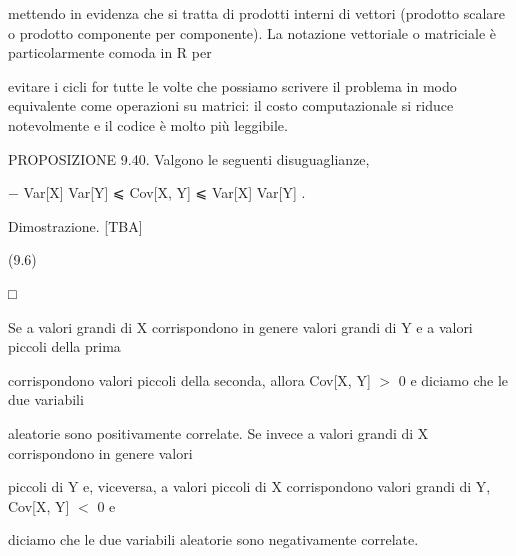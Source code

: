 \documentclass[a4paper,portrait,12pt]{article}
\begin{document}
\begin{flushleft}
mettendo in evidenza che si tratta di prodotti interni di vettori (prodotto scalare o prodotto componente per componente). La notazione vettoriale o matriciale \`{e} particolarmente comoda in R per
\end{flushleft}


\begin{flushleft}
evitare i cicli for tutte le volte che possiamo scrivere il problema in modo equivalente come operazioni su matrici: il costo computazionale si riduce notevolmente e il codice \`{e} molto più leggibile.
\end{flushleft}


\begin{flushleft}
PROPOSIZIONE 9.40. Valgono le seguenti disuguaglianze,
\end{flushleft}


\begin{flushleft}
$-$ Var[X] Var[Y] ⩽ Cov[X, Y] ⩽ Var[X] Var[Y] .
\end{flushleft}


\begin{flushleft}
Dimostrazione. [TBA]
\end{flushleft}





(9.6)


□





\begin{flushleft}
Se a valori grandi di X corrispondono in genere valori grandi di Y e a valori piccoli della prima
\end{flushleft}


\begin{flushleft}
corrispondono valori piccoli della seconda, allora Cov[X, Y] $>$ 0 e diciamo che le due variabili
\end{flushleft}


\begin{flushleft}
aleatorie sono positivamente correlate. Se invece a valori grandi di X corrispondono in genere valori
\end{flushleft}


\begin{flushleft}
piccoli di Y e, viceversa, a valori piccoli di X corrispondono valori grandi di Y, Cov[X, Y] $<$ 0 e
\end{flushleft}


\begin{flushleft}
diciamo che le due variabili aleatorie sono negativamente correlate.
\end{flushleft}
\end{document}
